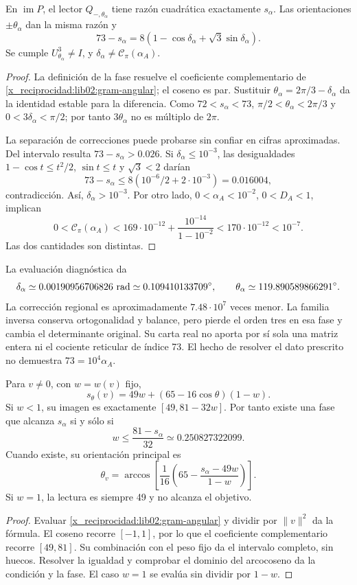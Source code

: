 \begin{corollary}
\label{x_reciprocidad:lib02:fase-alpha}
En \(\operatorname{im}P\), el lector
\(Q_{-,\theta_\alpha}\) tiene razón cuadrática exactamente
\(s_\alpha\). Las orientaciones \(\pm\theta_\alpha\) dan la
misma razón y
\[
 73-s_\alpha
 =8(1-\cos\delta_\alpha+\sqrt3\sin\delta_\alpha).
\]
Se cumple \(U_{\theta_\alpha}^3\ne I\), y
\(\delta_\alpha\ne\mathcal C_\pi(\alpha_A)\).
\end{corollary}
\begin{proof}
La definición de la fase resuelve el coeficiente complementario de
\eqref{x_reciprocidad:lib02:gram-angular}; el coseno es par. Sustituir
\(\theta_\alpha=2\pi/3-\delta_\alpha\) da la identidad estable
para la diferencia. Como \(72<s_\alpha<73\),
\(\pi/2<\theta_\alpha<2\pi/3\) y
\(0<3\delta_\alpha<\pi/2\); por tanto \(3\theta_\alpha\)
no es múltiplo de \(2\pi\).

La separación de correcciones puede probarse sin confiar en cifras
aproximadas. Del intervalo resulta \(73-s_\alpha>0.026\).
Si \(\delta_\alpha\leq10^{-3}\), las desigualdades
\(1-\cos t\leq t^2/2\), \(\sin t\leq t\) y
\(\sqrt3<2\) darían
\[
 73-s_\alpha\leq8(10^{-6}/2+2\cdot10^{-3})=0.016004,
\]
contradicción. Así, \(\delta_\alpha>10^{-3}\). Por otro lado,
\(0<\alpha_A<10^{-2}\), \(0<D_A<1\), implican
\[
 0<\mathcal C_\pi(\alpha_A)
 <169\cdot10^{-12}+\frac{10^{-14}}{1-10^{-2}}
 <170\cdot10^{-12}<10^{-7}.
\]
Las dos cantidades son distintas.
\end{proof}

La evaluación diagnóstica da
\[
 \delta_\alpha\simeq0.00190956706826\ {\rm rad}
 \simeq0.109410133709^\circ,\qquad
 \theta_\alpha\simeq119.890589866291^\circ.
\]
La corrección regional es aproximadamente \(7.48\cdot10^7\) veces
menor. La familia inversa conserva ortogonalidad y balance, pero pierde
el orden tres en esa fase y cambia el determinante original. Su carta
real no aporta por sí sola una matriz entera ni el cociente reticular de
índice 73. El hecho de resolver el dato prescrito no demuestra
\(73=10^4\alpha_A\).

\begin{proposition}
\label{x_reciprocidad:lib02:alcanzabilidad}
Para \(v\ne0\), con \(w=w(v)\) fijo,
\[
 s_\theta(v)=49w+(65-16\cos\theta)(1-w).
\]
Si \(w<1\), su imagen es exactamente
\([49,81-32w]\). Por tanto existe una fase que alcanza
\(s_\alpha\) si y sólo si
\[
 w\leq\frac{81-s_\alpha}{32}\simeq0.250827322099.
\]
Cuando existe, su orientación principal es
\[
 \theta_v=\arccos\left[
 \frac1{16}\left(65-\frac{s_\alpha-49w}{1-w}\right)\right].
\]
Si \(w=1\), la lectura es siempre 49 y no alcanza el objetivo.
\end{proposition}
\begin{proof}
Evaluar \eqref{x_reciprocidad:lib02:gram-angular} y dividir por \(\|v\|^2\)
da la fórmula. El coseno recorre \([-1,1]\), por lo que el
coeficiente complementario recorre \([49,81]\). Su combinación con
el peso fijo da el intervalo completo, sin huecos. Resolver la igualdad
y comprobar el dominio del arcocoseno da la condición y la fase.
El caso \(w=1\) se evalúa sin dividir por \(1-w\).
\end{proof}

